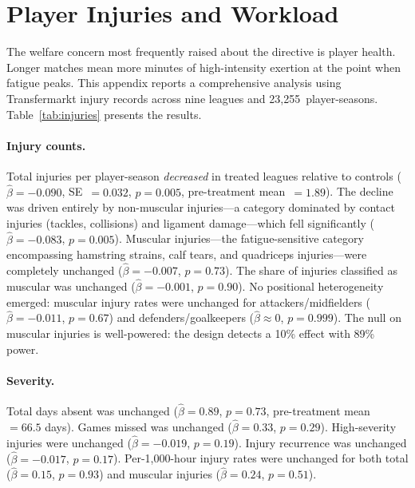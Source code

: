 
\section{Player Injuries and Workload}
\label{app:injuries}

The welfare concern most frequently raised about the directive is
player health. Longer matches mean more minutes of high-intensity
exertion at the point when fatigue peaks. This appendix reports a
comprehensive analysis using Transfermarkt injury records across
nine leagues and 23,255~player-seasons. Table~\ref{tab:injuries}
presents the results.


\paragraph{Injury counts.}
Total injuries per player-season \textit{decreased} in treated
leagues relative to controls ($\hat{\beta} = -0.090$, SE~$= 0.032$,
$p = 0.005$, pre-treatment mean~$= 1.89$). The decline was driven
entirely by non-muscular injuries---a category dominated by contact
injuries (tackles, collisions) and ligament damage---which fell
significantly ($\hat{\beta} = -0.083$, $p = 0.005$). Muscular
injuries---the fatigue-sensitive category encompassing hamstring
strains, calf tears, and quadriceps injuries---were completely
unchanged ($\hat{\beta} = -0.007$, $p = 0.73$). The share of
injuries classified as muscular was unchanged ($\hat{\beta} = -0.001$,
$p = 0.90$). No positional heterogeneity emerged: muscular injury
rates were unchanged for attackers/midfielders ($\hat{\beta} = -0.011$,
$p = 0.67$) and defenders/goalkeepers
($\hat{\beta} \approx 0$, $p = 0.999$). The null on muscular
injuries is well-powered: the design detects a 10\% effect with
89\% power.

\paragraph{Severity.}
Total days absent was unchanged ($\hat{\beta} = 0.89$, $p = 0.73$,
pre-treatment mean~$= 66.5$ days). Games missed was unchanged
($\hat{\beta} = 0.33$, $p = 0.29$). High-severity injuries were
unchanged ($\hat{\beta} = -0.019$, $p = 0.19$). Injury recurrence
was unchanged ($\hat{\beta} = -0.017$, $p = 0.17$). Per-1,000-hour
injury rates were unchanged for both total ($\hat{\beta} = 0.15$,
$p = 0.93$) and muscular injuries ($\hat{\beta} = 0.24$, $p = 0.51$).


